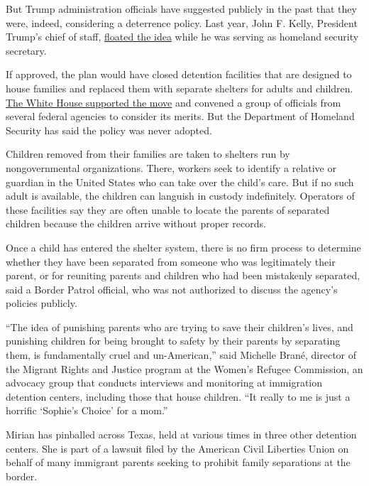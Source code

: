 But Trump administration officials have suggested publicly in the past
that they were, indeed, considering a deterrence policy. Last year, John
F. Kelly, President Trump's chief of staff,
\href{https://www.cnn.com/2017/03/06/politics/john-kelly-separating-children-from-parents-immigration-border/}{floated
the idea} while he was serving as homeland security secretary.

If approved, the plan would have closed detention facilities that are
designed to house families and replaced them with separate shelters for
adults and children.
\href{https://www.nytimes3xbfgragh.onion/2017/12/21/us/trump-immigrant-families-separate.html}{The
White House supported the move} and convened a group of officials from
several federal agencies to consider its merits. But the Department of
Homeland Security has said the policy was never adopted.

Children removed from their families are taken to shelters run by
nongovernmental organizations. There, workers seek to identify a
relative or guardian in the United States who can take over the child's
care. But if no such adult is available, the children can languish in
custody indefinitely. Operators of these facilities say they are often
unable to locate the parents of separated children because the children
arrive without proper records.

Once a child has entered the shelter system, there is no firm process to
determine whether they have been separated from someone who was
legitimately their parent, or for reuniting parents and children who had
been mistakenly separated, said a Border Patrol official, who was not
authorized to discuss the agency's policies publicly.

``The idea of punishing parents who are trying to save their children's
lives, and punishing children for being brought to safety by their
parents by separating them, is fundamentally cruel and un-American,''
said Michelle Brané, director of the Migrant Rights and Justice program
at the Women's Refugee Commission, an advocacy group that conducts
interviews and monitoring at immigration detention centers, including
those that house children. ``It really to me is just a horrific
`Sophie's Choice' for a mom.''

Mirian has pinballed across Texas, held at various times in three other
detention centers. She is part of a lawsuit filed by the American Civil
Liberties Union on behalf of many immigrant parents seeking to prohibit
family separations at the border.

